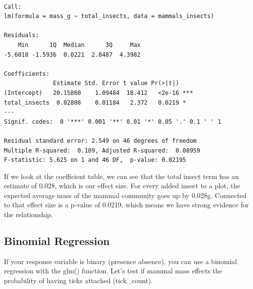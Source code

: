 \documentclass[
  letterpaper,
  DIV=11,
  numbers=noendperiod]{scrreprt}
\newenvironment{Shaded}{\begin{snugshade}}{\end{snugshade}}
\newcommand{\AttributeTok}[1]{\textcolor[rgb]{0.40,0.45,0.13}{#1}}
\newcommand{\DecValTok}[1]{\textcolor[rgb]{0.68,0.00,0.00}{#1}}
\newcommand{\DocumentationTok}[1]{\textcolor[rgb]{0.37,0.37,0.37}{\textit{#1}}}
\newcommand{\FunctionTok}[1]{\textcolor[rgb]{0.28,0.35,0.67}{#1}}
\newcommand{\NormalTok}[1]{\textcolor[rgb]{0.00,0.23,0.31}{#1}}
\newcommand{\OtherTok}[1]{\textcolor[rgb]{0.00,0.23,0.31}{#1}}
\newcommand{\SpecialCharTok}[1]{\textcolor[rgb]{0.37,0.37,0.37}{#1}}
\newcommand{\StringTok}[1]{\textcolor[rgb]{0.13,0.47,0.30}{#1}}
\begin{document}
\begin{verbatim}

Call:
lm(formula = mass_g ~ total_insects, data = mammals_insects)

Residuals:
    Min      1Q  Median      3Q     Max 
-5.6018 -1.5936  0.0221  2.0487  4.3982 

Coefficients:
              Estimate Std. Error t value Pr(>|t|)    
(Intercept)   20.15860    1.09484  18.412   <2e-16 ***
total_insects  0.02808    0.01184   2.372   0.0219 *  
---
Signif. codes:  0 '***' 0.001 '**' 0.01 '*' 0.05 '.' 0.1 ' ' 1

Residual standard error: 2.549 on 46 degrees of freedom
Multiple R-squared:  0.109, Adjusted R-squared:  0.08959 
F-statistic: 5.625 on 1 and 46 DF,  p-value: 0.02195
\end{verbatim}

If we look at the coefficient table, we can see that the total insect
term has an estimate of 0.028, which is our effect size. For every added
insect to a plot, the expected average mass of the mammal community goes
up by 0.028g. Connected to that effect size is a p-value of 0.0219,
which means we have strong evidence for the relationship.

\subsection{Binomial Regression}\label{binomial-regression}

If your response variable is binary (presence absence), you can use a
binomial regression with the glm() function. Let's test if mammal mass
effects the probability of having ticks attached (tick\_count).

\begin{Shaded}
\end{Shaded}
\end{document}
